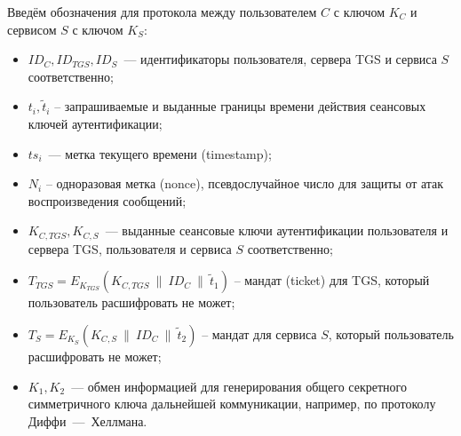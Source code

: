 Введём обозначения для протокола между пользователем $C$ с ключом $K_C$ и сервисом $S$ с ключом $K_S$:
\begin{itemize}
    \item $ID_C, ID_{TGS}, ID_S$~--- идентификаторы пользователя, сервера TGS и сервиса $S$ соответственно;
    \item $t_i, \tilde{t}_i$ -- запрашиваемые и выданные границы времени действия сеансовых ключей аутентификации;
    \item $ts_i$~--- метка текущего времени (timestamp);
    \item $N_i$ -- одноразовая метка (nonce), псевдослучайное число для защиты от атак воспроизведения сообщений;
    \item $K_{C,TGS}, K_{C,S}$~--- выданные сеансовые ключи аутентификации пользователя и сервера TGS, пользователя и сервиса $S$ соответственно;
    \item $T_{TGS} = E_{K_{TGS}}(K_{C,TGS} ~\|~ ID_C ~\|~ \tilde{t}_1)$ -- мандат (ticket) для TGS, который пользователь расшифровать не может;
    \item $T_{S} = E_{K_S}(K_{C,S} ~\|~ ID_C ~\|~ \tilde{t}_2)$ -- мандат для сервиса $S$, который пользователь расшифровать не может;
    \item $K_1, K_2$~--- обмен информацией для генерирования общего секретного симметричного ключа дальнейшей коммуникации, например, по протоколу Диффи~---~Хеллмана.
\end{itemize}

